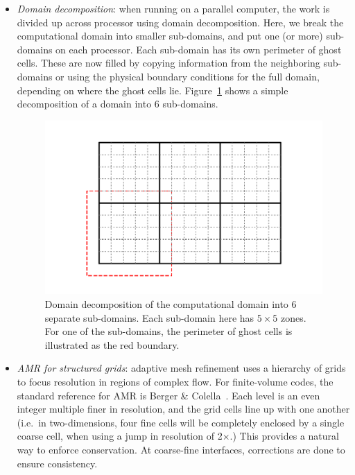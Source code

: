 \begin{itemize}

\item {\em Domain decomposition}: when running on a parallel computer,
 the work is divided up across processor using domain decomposition.
 Here, we break the computational domain into smaller sub-domains, and
 put one (or more) sub-domains on each processor.  Each sub-domain
 has its own perimeter of ghost cells.  These are now filled by copying
 information from the neighboring sub-domains or using the physical
 boundary conditions for the full domain, depending on where the 
 ghost cells lie.  Figure~\ref{fig:domain} shows a simple decomposition of
 a domain into 6 sub-domains.

 \begin{figure}
 \centering
 \includegraphics[width=\linewidth]{domain}
 \caption[Domain decomposition example.]{\label{fig:domain} Domain
   decomposition of the computational domain into 6 separate
   sub-domains.  Each sub-domain here has $5\times 5$ zones.  For one
   of the sub-domains, the perimeter of ghost cells is illustrated as
   the red boundary.}
 \end{figure}

\item {\em AMR for structured grids}: adaptive mesh refinement uses a
  hierarchy of grids to focus resolution in regions of complex flow.
  For finite-volume codes, the standard reference for AMR is Berger \&
  Colella~\cite{berger-colella}.  Each level is an even integer
  multiple finer in resolution, and the grid cells line up with one
  another (i.e.\ in two-dimensions, four fine cells will be completely
  enclosed by a single coarse cell, when using a jump in resolution of
  2$\times$.)  This provides a natural way to enforce conservation.
  At coarse-fine interfaces, corrections are done to ensure
  consistency.

\end{itemize}
